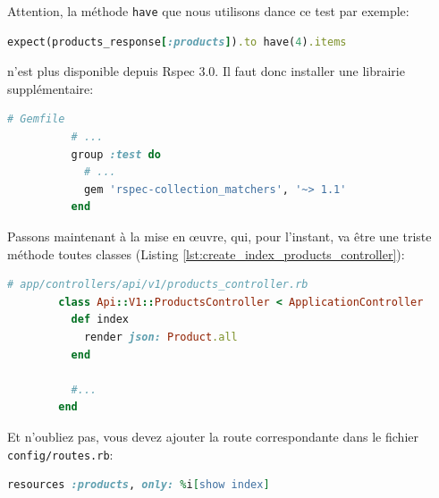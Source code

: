 \documentclass[]{report}
\begin{document}
      \begin{tcolorbox}
        Attention, la méthode \verb|have| que nous utilisons dance ce test par exemple:

        \begin{scriptsize}
          \begin{lstlisting}[language=ruby]
          expect(products_response[:products]).to have(4).items
          \end{lstlisting}
        \end{scriptsize}

        n'est plus disponible depuis Rspec 3.0. Il faut donc installer une librairie supplémentaire:

        \begin{scriptsize}
          \begin{lstlisting}[language=ruby]
          # Gemfile
          # ...
          group :test do
            # ...
            gem 'rspec-collection_matchers', '~> 1.1'
          end
          \end{lstlisting}
        \end{scriptsize}


      \end{tcolorbox}

      Passons maintenant à la mise en œuvre, qui, pour l'instant, va être une triste méthode toutes classes (Listing \ref{lst:create_index_products_controller}):

      \begin{scriptsize}
        \begin{lstlisting}[language=ruby, caption={Méthode d'affichage des produits}, label={lst:create_index_products_controller}]
        # app/controllers/api/v1/products_controller.rb
        class Api::V1::ProductsController < ApplicationController
          def index
            render json: Product.all
          end

          #...
        end
        \end{lstlisting}
      \end{scriptsize}

      Et n'oubliez pas, vous devez ajouter la route correspondante dans le fichier \verb|config/routes.rb|:

      \begin{scriptsize}
        \begin{lstlisting}[language=ruby]
        resources :products, only: %i[show index]
        \end{lstlisting}
      \end{scriptsize}
\end{document}
